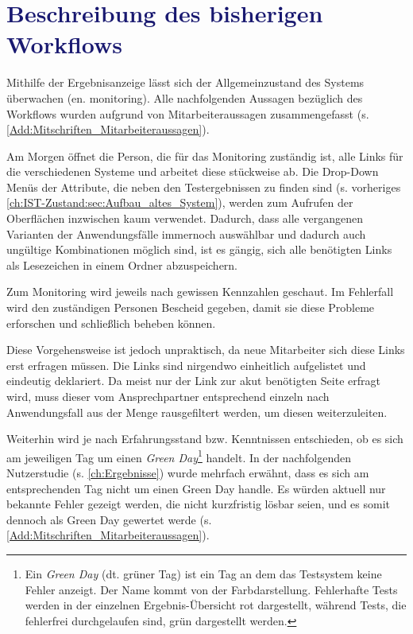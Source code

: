 \section{\textcolor{MidnightBlue}{Beschreibung des bisherigen Workflows}}
\label{ch:IST-Zustand:sec:Workflow}

Mithilfe der Ergebnisanzeige lässt sich der Allgemeinzustand des Systems überwachen (en. monitoring). Alle nachfolgenden Aussagen bezüglich des Workflows wurden aufgrund von Mitarbeiteraussagen zusammengefasst (s. \autoref{Add:Mitschriften_Mitarbeiteraussagen}).


Am Morgen öffnet die Person, die für das Monitoring zuständig ist, alle Links für die verschiedenen Systeme und arbeitet diese stückweise ab.
Die Drop-Down Menüs der Attribute, die neben den Testergebnissen zu finden sind (s. vorheriges \autoref{ch:IST-Zustand:sec:Aufbau_altes_System}), werden zum Aufrufen der Oberflächen inzwischen kaum verwendet. Dadurch, dass alle vergangenen Varianten der Anwendungsfälle immernoch auswählbar und dadurch auch ungültige Kombinationen möglich sind, ist es gängig, sich alle benötigten Links als Lesezeichen in einem Ordner abzuspeichern.

Zum Monitoring wird jeweils nach gewissen Kennzahlen geschaut. Im Fehlerfall wird den zuständigen Personen Bescheid gegeben, damit sie diese Probleme erforschen und schließlich beheben können.

Diese Vorgehensweise ist jedoch unpraktisch, da neue Mitarbeiter sich diese Links erst erfragen müssen. Die Links sind nirgendwo einheitlich aufgelistet und eindeutig deklariert. Da meist nur der Link zur akut benötigten Seite erfragt wird, muss dieser vom Ansprechpartner entsprechend einzeln nach Anwendungsfall aus der Menge rausgefiltert werden, um diesen weiterzuleiten.

Weiterhin wird je nach Erfahrungsstand bzw. Kenntnissen entschieden, ob es sich am jeweiligen Tag um einen \textit{Green Day}\footnote{Ein \textit{Green Day} (dt. grüner Tag) ist ein Tag an dem das Testsystem keine Fehler anzeigt. Der Name kommt von der Farbdarstellung. Fehlerhafte Tests werden in der einzelnen Ergebnis-Übersicht rot dargestellt, während Tests, die fehlerfrei durchgelaufen sind, grün dargestellt werden.} handelt. In der nachfolgenden Nutzerstudie (s. \autoref{ch:Ergebnisse}) wurde mehrfach erwähnt, dass es sich am entsprechenden Tag nicht um einen Green Day handle. Es würden aktuell nur bekannte Fehler gezeigt werden, die nicht kurzfristig lösbar seien, und es somit dennoch als Green Day gewertet werde (s. \autoref{Add:Mitschriften_Mitarbeiteraussagen}).

